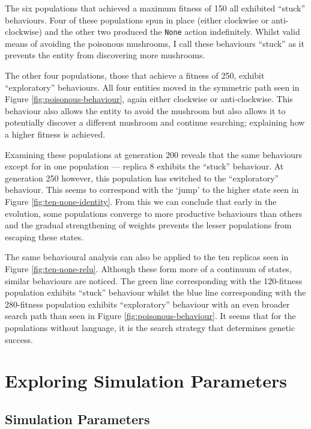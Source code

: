 \documentclass[12pt,a4paper,twoside,openright]{report}
\begin{document}
The six populations that achieved a maximum fitness of 150 all exhibited ``stuck'' behaviours. Four of these populations spun in place (either clockwise or anti-clockwise) and the other two produced the \verb~None~ action indefinitely. Whilst valid means of avoiding the poisonous mushrooms, I call these behaviours ``stuck'' as it prevents the entity from discovering more mushrooms.

The other four populations, those that achieve a fitness of 250, exhibit ``exploratory'' behaviours. All four entities moved in the symmetric path seen in Figure \ref{fig:poisonous-behaviour}, again either clockwise or anti-clockwise. This behaviour also allows the entity to avoid the mushroom but also allows it to potentially discover a different mushroom and continue searching; explaining how a higher fitness is achieved. 

Examining these populations at generation 200 reveals that the same behaviours except for in one population --- replica 8 exhibits the ``stuck'' behaviour. At generation 250 however, this population has switched to the ``exploratory'' behaviour. This seems to correspond with the `jump' to the higher state seen in Figure \ref{fig:ten-none-identity}. From this we can conclude that early in the evolution, some populations converge to more productive behaviours than others and the gradual strengthening of weights prevents the lesser populations from escaping these states.

The same behavioural analysis can also be applied to the ten replicas seen in Figure \ref{fig:ten-none-relu}. Although these form more of a continuum of states, similar behaviours are noticed. The green line corresponding with the 120-fitness population exhibits ``stuck'' behaviour whilst the blue line corresponding with the 280-fitness population exhibits ``exploratory'' behaviour with an even broader search path than seen in Figure \ref{fig:poisonous-behaviour}. It seems that for the populations without language, it is the search strategy that determines genetic success.

\section{Exploring Simulation Parameters}\label{section:simulation-parameters}

\subsection{Simulation Parameters}
 
\end{document}
